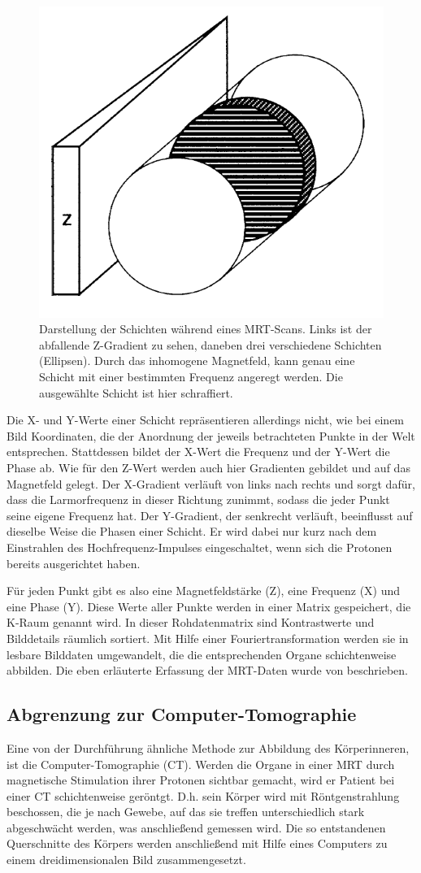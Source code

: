 \begin{figure}[!htb]
	\centering
	\includegraphics[width=0.3\linewidth]{images/zGradientMrt.png}
	\caption{Darstellung der Schichten während eines MRT-Scans. Links ist der abfallende Z-Gradient zu sehen, daneben drei verschiedene Schichten (Ellipsen). Durch das inhomogene Magnetfeld, kann genau eine Schicht mit einer bestimmten Frequenz angeregt werden. Die ausgewählte Schicht ist hier schraffiert.}
	\label{img:zGradient}
\end{figure}
\FloatBarrier

Die X- und Y-Werte einer Schicht repräsentieren allerdings nicht, wie bei einem Bild Koordinaten, die der Anordnung der jeweils betrachteten Punkte in der Welt entsprechen. Stattdessen bildet der X-Wert die Frequenz und der Y-Wert die Phase ab. Wie für den Z-Wert werden auch hier Gradienten gebildet und auf das Magnetfeld gelegt. Der X-Gradient verläuft von links nach rechts und sorgt dafür, dass die Larmorfrequenz in dieser Richtung zunimmt, sodass die jeder Punkt seine eigene Frequenz hat. Der Y-Gradient, der senkrecht verläuft, beeinflusst auf dieselbe Weise die Phasen einer Schicht. Er wird dabei nur kurz nach dem Einstrahlen des Hochfrequenz-Impulses eingeschaltet, wenn sich die Protonen bereits ausgerichtet haben.

Für jeden Punkt gibt es also eine Magnetfeldstärke (Z), eine Frequenz (X) und eine Phase (Y). Diese Werte aller Punkte werden in einer Matrix gespeichert, die K-Raum genannt wird. In dieser Rohdatenmatrix sind Kontrastwerte und Bilddetails räumlich sortiert. Mit Hilfe einer Fouriertransformation werden sie in lesbare Bilddaten umgewandelt, die die entsprechenden Organe schichtenweise abbilden. 
Die eben erläuterte Erfassung der MRT-Daten wurde von \cite{weishaupt09} beschrieben.

\subsection{Abgrenzung zur Computer-Tomographie}

Eine von der Durchführung ähnliche Methode zur Abbildung des Körperinneren, ist die Computer-Tomographie (CT). Werden die Organe in einer MRT durch magnetische Stimulation ihrer Protonen sichtbar gemacht, wird er Patient bei einer CT schichtenweise geröntgt. D.h. sein Körper wird mit Röntgenstrahlung beschossen, die je nach Gewebe, auf das sie treffen unterschiedlich stark abgeschwächt werden, was anschließend gemessen wird. Die so entstandenen Querschnitte des Körpers werden anschließend mit Hilfe eines Computers zu einem dreidimensionalen Bild zusammengesetzt. \cite{ct1}


